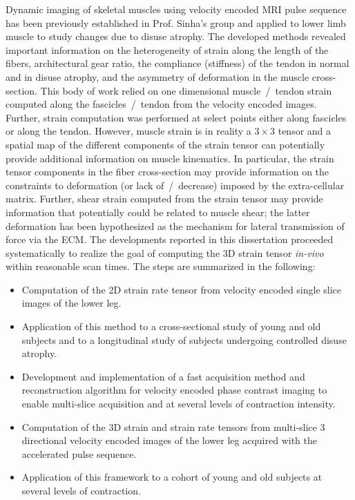 Dynamic imaging of skeletal muscles using velocity encoded MRI pulse sequence has been previously established in Prof. Sinha's group and applied to lower limb muscle to study changes due to disuse atrophy. 
The developed methods revealed important information on the heterogeneity of strain along the length of the fibers, architectural gear ratio, the compliance (stiffness) of the tendon in normal and in disuse atrophy, and the asymmetry of deformation in the muscle cross-section. 
This body of work relied on one dimensional muscle~/~tendon strain computed along the fascicles~/~tendon from the velocity encoded images. 
Further, strain computation was performed at select points either along fascicles or along the tendon. 
However, muscle strain is in reality a $3 \times 3$ tensor and a spatial map of the different components of the strain tensor can potentially provide additional information on muscle kinematics. 
In particular, the strain tensor components in the fiber cross-section may provide information on the constraints to deformation (or lack of~/~decrease) imposed by the extra-cellular matrix. 
Further, shear strain computed from the strain tensor may provide information that potentially could be related to muscle shear; the latter deformation has been hypothesized as the mechanism for lateral transmission of force via the ECM. 
The developments reported in this dissertation proceeded systematically to realize the goal of computing the 3D strain tensor \textit{in-vivo} within reasonable scan times. 
The steps are summarized in the following: 
\begin{itemize}
\item Computation of the 2D strain rate tensor from velocity encoded single slice images of the lower leg.
\item Application of this method to a cross-sectional study of young and old subjects and to a longitudinal study of subjects undergoing controlled disuse atrophy.
\item Development and implementation of a fast acquisition method and reconstruction algorithm for velocity encoded phase contrast imaging to enable multi-slice acquisition and at several levels of contraction intensity.
\item Computation of the 3D strain and strain rate tensors from multi-slice 3 directional velocity encoded images of the lower leg acquired with the accelerated pulse sequence.
\item Application of this framework to a cohort of young and old subjects at several levels of contraction.	
\end{itemize}

